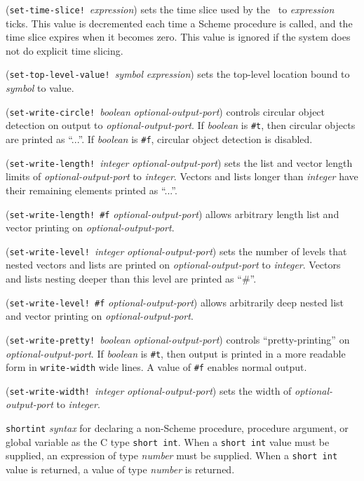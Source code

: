 \documentclass[10pt,twocolumn]{article}
\begin{document}
(\texttt{set-time-slice!}\ \emph{expression}) sets the time slice used
by the \StoC\ to \emph{expression} ticks. This value is decremented
each time a Scheme procedure is called, and the time slice expires
when it becomes zero.  This value is ignored if the system does not do
explicit time slicing.

(\texttt{set-top-level-value!}\ \emph{symbol} \emph{expression}) sets
the top-level location bound to \emph{symbol} to value.

(\texttt{set-write-circle!}\ \emph{boolean}
\emph{optional-output-port}) controls circular object detection on
output to \emph{optional-output-port}. If \emph{boolean} is
\texttt{\#t}, then circular objects are printed as ``...''.  If
\emph{boolean} is \texttt{\#f}, circular object detection is disabled.

(\texttt{set-write-length!}\ \emph{integer}
\emph{optional-output-port}) sets the list and vector length limits of
\emph{optional-output-port} to \emph{integer}.  Vectors and lists
longer than \emph{integer} have their remaining elements printed as
``...''.

(\texttt{set-write-length!}\ \texttt{\#f} \emph{optional-output-port})
allows arbitrary length list and vector printing on
\emph{optional-output-port}.

(\texttt{set-write-level!}\ \emph{integer}
\emph{optional-output-port}) sets the number of levels that nested
vectors and lists are printed on \emph{optional-output-port} to
\emph{integer}.  Vectors and lists nesting deeper than this level are
printed as ``\#''.

(\texttt{set-write-level!}\ \texttt{\#f} \emph{optional-output-port})
allows arbitrarily deep nested list and vector printing on
\emph{optional-output-port}.

(\texttt{set-write-pretty!}\ \emph{boolean}
\emph{optional-output-port}) controls ``pretty-printing'' on
\emph{optional-output-port}.  If \emph{boolean} is \texttt{\#t}, then
output is printed in a more readable form in \texttt{write-width} wide
lines.  A value of \texttt{\#f} enables normal output.

(\texttt{set-write-width!}\ \emph{integer}
\emph{optional-output-port}) sets the width of
\emph{optional-output-port} to \emph{integer}.

\texttt{shortint} \emph{syntax} for declaring a non-Scheme procedure,
procedure argument, or global variable as the C type \texttt{short
  int}.  When a \texttt{short int} value must be supplied, an
expression of type \emph{number} must be supplied.  When a
\texttt{short int} value is returned, a value of type \emph{number} is
returned.
\end{document}
